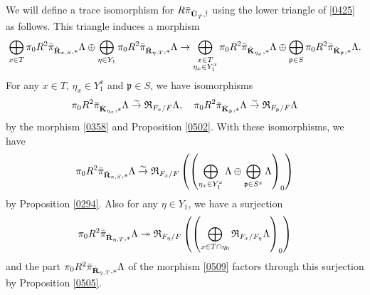 \documentclass{amsart}
\theoremstyle{remark}
\numberwithin{equation}{subsection}
\newcommand{\onto}{\twoheadrightarrow}
\newcommand{\isomto}{\overset{\sim}{\to}}
\newcommand{\alg}[1]{\mathbf{#1}}
\newcommand{\ideal}[1]{\mathfrak{#1}}
\newcommand{\Weil}{\mathfrak{R}}
\begin{document}
We will define a trace isomorphism for $R \Bar{\pi}_{\Hat{\alg{U}}_{\Hat{T}}, \Hat{!}}$
using the lower triangle of \eqref{0425} as follows.
This triangle induces a morphism
	\begin{equation} \label{0509}
				\bigoplus_{x \in T}
					\pi_{0} R^{2} \Bar{\pi}_{\Hat{\alg{R}}_{x, S}, \ast} \Lambda
			\oplus
				\bigoplus_{\eta \in Y_{1}}
					\pi_{0} R^{2} \Bar{\pi}_{\Hat{\alg{R}}_{\eta, T}, \ast} \Lambda
		\to
				\bigoplus_{
					\substack{
						x \in T \\
						\eta_{x} \in Y_{1}^{x}
					}
				}
					\pi_{0} R^{2} \Bar{\pi}_{\Hat{\alg{K}}_{\eta_{x}}, \ast} \Lambda
			\oplus
				\bigoplus_{\ideal{p} \in S}
					\pi_{0} R^{2} \Bar{\pi}_{\Hat{\alg{K}}_{\ideal{p}}, \ast} \Lambda.
	\end{equation}
For any $x \in T$, $\eta_{x} \in Y_{1}^{x}$ and $\ideal{p} \in S$,
we have isomorphisms
	\begin{equation} \label{0506}
			\pi_{0} R^{2} \Bar{\pi}_{\Hat{\alg{K}}_{\eta_{x}}, \ast} \Lambda
		\isomto
			\Weil_{F_{x} / F} \Lambda,
		\quad
			\pi_{0} R^{2} \Bar{\pi}_{\Hat{\alg{K}}_{\ideal{p}}, \ast} \Lambda
		\isomto
			\Weil_{F_{\ideal{p}} / F} \Lambda
	\end{equation}
by the morphism \eqref{0358} and Proposition \ref{0502}.
With these isomorphisms, we have
	\begin{equation} \label{0507}
			\pi_{0} R^{2} \Bar{\pi}_{\Hat{\alg{R}}_{x, S}, \ast} \Lambda
		\isomto
			\Weil_{F_{x} / F} \left(
				\left(
						\bigoplus_{\eta_{x} \in Y_{1}^{x}} \Lambda
					\oplus
						\bigoplus_{\ideal{p} \in S^{x}} \Lambda
				\right)_{0}
			\right)
	\end{equation}
by Proposition \ref{0294}.
Also for any $\eta \in Y_{1}$, we have a surjection
	\begin{equation} \label{0508}
			\pi_{0} R^{2} \Bar{\pi}_{\Hat{\alg{R}}_{\eta, T}, \ast} \Lambda
		\onto
			\Weil_{F_{\eta} / F} \left(
				\left(
					\bigoplus_{x \in T \cap \eta_{0}}
						\Weil_{F_{x} / F_{\eta}} \Lambda
				\right)_{0}
			\right)
	\end{equation}
and the part $\pi_{0} R^{2} \Bar{\pi}_{\Hat{\alg{R}}_{\eta, T}, \ast} \Lambda$
of the morphism \eqref{0509} factors through this surjection by Proposition \ref{0505}.
\end{document}
